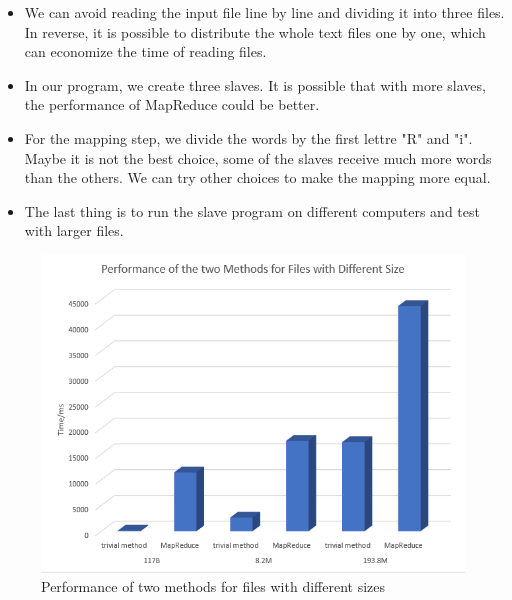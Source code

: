 \documentclass[a4paper,14pt,UTF8]{article}
\begin{document}
	\begin{itemize}
		
		\item 
		We can avoid reading the input file line by line and dividing it into three files. In reverse, it is possible to distribute the whole text files one by one, which can economize the time of reading files.  \\
		
		\item 
		In our program, we create three slaves. It is possible that with more slaves, the performance of MapReduce could be better.\\
		
		\item 
		For the mapping step, we divide the words by the first lettre "R" and "i". Maybe it is not the best choice, some of the slaves receive much more words than the others. We can try other choices to make the mapping more equal.\\
		
		\item 
		The last thing is to run the slave program on different computers and test with larger files.  \\
		
	\end{itemize}
	

				
	\begin{figure}[h]
		\setlength{\abovecaptionskip}{-0.cm}
			
		\begin{center}
			\includegraphics[width=12cm]{performance}
		\end{center}
		\caption{Performance of two methods for files with different sizes}
	\end{figure}
\end{document}
